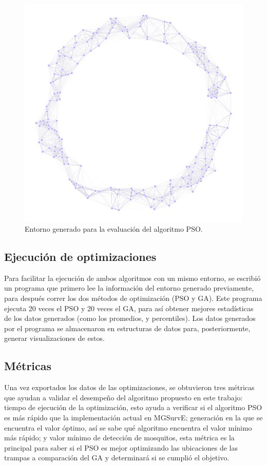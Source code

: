   \begin{figure}[ht!]
    \centering
    \includegraphics[width=\textwidth]{eval-env.png}
    \caption{Entorno generado para la evaluación del algoritmo PSO.}
    \label{fig:evaluation-env}
  \end{figure}

  \subsection{Ejecución de optimizaciones}

  Para facilitar la ejecución de ambos algoritmos con un mismo entorno, se
  escribió un programa que primero lee la información del entorno generado
  previamente, para después correr los dos métodos de optimización (PSO y
  GA). Este programa ejecuta 20 veces el PSO y 20 veces el GA, para así
  obtener mejores estadísticas de los datos generados (como los promedios, y
  percentiles). Los datos generados por el programa se almacenaron en
  estructuras de datos para, posteriormente, generar visualizaciones de estos.

  \subsection{Métricas}

  Una vez exportados los datos de las optimizaciones, se obtuvieron tres
  métricas que ayudan a validar el desempeño del algoritmo propuesto en este
  trabajo: tiempo de ejecución de la optimización, esto ayuda a verificar si
  el algoritmo PSO es más rápido que la implementación actual en MGSurvE;
  generación en la que se encuentra el valor óptimo, así se sabe qué algoritmo
  encuentra el valor mínimo más rápido; y valor mínimo de detección de
  mosquitos, esta métrica es la principal para saber si el PSO es mejor
  optimizando las ubicaciones de las trampas a comparación del GA y
  determinará si se cumplió el objetivo.

